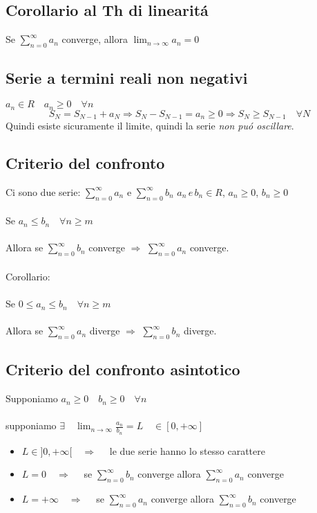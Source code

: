 \documentclass[a4paper,10pt,italian]{article}
\begin{document}
\subsection{Corollario al Th di linearit\'a}
Se $\sum_{n=0}^{\infty}a_n$ converge, allora $\lim_{n\rightarrow \infty} a_n = 0$

\subsection{Serie a termini reali non negativi}
$a_n \in R \quad a_n \geq 0 \quad \forall n$ 
$$ S_N = S_{N-1} + a_N \Rightarrow S_N - S_{N-1} = a_n \geq 0 \Rightarrow S_N \geq S_{N-1} \quad \forall N $$
Quindi esiste sicuramente il limite, quindi la serie \emph{non pu\'o oscillare}.

\subsection{Criterio del confronto}
Ci sono due serie: $\sum_{n=0}^{\infty}a_n$ e $\sum_{n=0}^{\infty}b_n$ \quad $a_n\,e\,b_n \in R$, $a_n\geq 0$, $b_n\geq 0$ \\ \\
Se $a_n \leq b_n \quad \forall n \geq m$ \\ \\
Allora se $\sum_{n=0}^{\infty} b_n$ converge $\Rightarrow$ $\sum_{n=0}^{\infty}a_n$ converge. \\ \\
Corollario: \\ \\
Se $0 \leq a_n \leq b_n \quad \forall n \geq m$ \\ \\
Allora se $\sum_{n=0}^{\infty} a_n$ diverge $\Rightarrow$ $\sum_{n=0}^{\infty}b_n$ diverge.

\subsection{Criterio del confronto asintotico}
Supponiamo $a_n \geq 0 \quad b_n \geq 0 \quad \forall n$ \\ \\
supponiamo $\exists \quad \lim_{n \rightarrow \infty} \frac{a_n}{b_n} = L \quad \in [0, + \infty]$
\begin{itemize}
\item $L \in ]0,+\infty[ \quad \Rightarrow \quad$ le due serie hanno lo stesso carattere
\item $L = 0 \quad \Rightarrow \quad$ se $\sum_{n=0}^{\infty}b_n$ converge allora $\sum_{n=0}^{\infty}a_n$ converge
\item $L = +\infty \quad \Rightarrow \quad$ se $\sum_{n=0}^{\infty} a_n$ converge allora $\sum_{n=0}^{\infty} b_n$ converge
\end{itemize}
\end{document}

